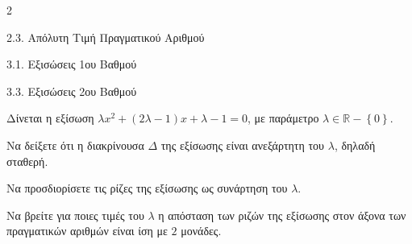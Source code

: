 \begin{ylh}{2}
    \item 2.3. Απόλυτη Τιμή Πραγματικού Αριθμού
    \item 3.1. Εξισώσεις 1ου Βαθμού
    \item 3.3. Εξισώσεις 2ου Βαθμού
\end{ylh}
Δίνεται η εξίσωση $\lambda x^{2} + (2\lambda - 1)x + \lambda - 1 = 0$, με παράμετρο $\lambda\mathbb{\in R -}\left\{ 0 \right\}$.
\begin{alist}
\item Να δείξετε ότι η διακρίνουσα $\Delta$ της εξίσωσης είναι ανεξάρτητη του $\lambda$, δηλαδή σταθερή.
\item Να προσδιορίσετε τις ρίζες της εξίσωσης ως συνάρτηση του $\lambda$.
\item Να βρείτε για ποιες τιμές του $\lambda$ η απόσταση των ριζών της εξίσωσης στον άξονα των πραγματικών αριθμών είναι ίση με $2$ μονάδες.
\end{alist}

